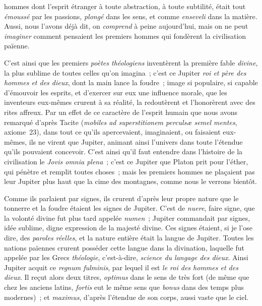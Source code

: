 \documentclass[french,twoside]{book} %
\begin{document}
hommes dont l’esprit étranger à toute abstraction, à toute subtilité, était tout {\itshape émoussé} par les passions, {\itshape plongé} dans les sens, et comme {\itshape enseveli} dans la matière. Aussi, nous l’avons déjà dit, on {\itshape comprend} à peine aujourd’hui, mais on ne peut {\itshape imaginer} comment pensaient les premiers hommes qui fondèrent la civilisation païenne.\par
\par
C’est ainsi que les premiers {\itshape poètes théologiens} inventèrent la première fable {\itshape divine}, la plus sublime de toutes celles qu’on imagina ; c’est ce Jupiter {\itshape roi et père des hommes et des dieux}, dont la main lance la foudre ; image si populaire, si capable  d’émouvoir les esprits, et d’exercer sur eux une influence morale, que les inventeurs eux-mêmes crurent à sa réalité, la redoutèrent et l’honorèrent avec des rites affreux. Par un effet de ce caractère de l’esprit humain que nous avons remarqué d’après Tacite (\emph{{\itshape mobiles ad superstitionem perculsæ semel mentes}}, axiome 23), dans tout ce qu’ils apercevaient, imaginaient, ou faisaient eux-mêmes, ils ne virent que Jupiter, animant ainsi l’univers dans toute l’étendue qu’ils pouvaient concevoir. C’est ainsi qu’il faut entendre dans l’histoire de la civilisation le {\itshape Jovis omnia plena} ; c’est ce Jupiter que Platon prit pour l’éther, qui pénètre et remplit toutes choses ; mais les premiers hommes ne plaçaient pas leur Jupiter plus haut que la cime des montagnes, comme nous le verrons bientôt.\par
Comme ils parlaient par signes, ils crurent d’après leur propre nature que le tonnerre et la foudre étaient les signes de Jupiter. C’est de {\itshape nuere}, faire signe, que la volonté divine fut plus tard appelée {\itshape numen} ; Jupiter commandait par signes, idée sublime, digne expression de la majesté divine. Ces signes étaient, si je l’ose dire, des {\itshape paroles réelles}, et la nature entière était la langue de Jupiter. Toutes les nations païennes crurent posséder cette langue dans la divination, laquelle fut appelée par les Grecs {\itshape théologie}, c’est-à-dire, {\itshape science du langage des dieux}. Ainsi Jupiter acquit ce {\itshape regnum fulminis}, par lequel il est {\itshape le roi des hommes et des dieux}. Il reçut alors deux titres, {\itshape optimus} dans le sens de  très fort (de même que chez les anciens latins, {\itshape fortis} eut le même sens que {\itshape bonus} dans des temps plus modernes) ; et {\itshape maximus}, d’après l’étendue de son corps, aussi vaste que le ciel.\par
\end{document}
